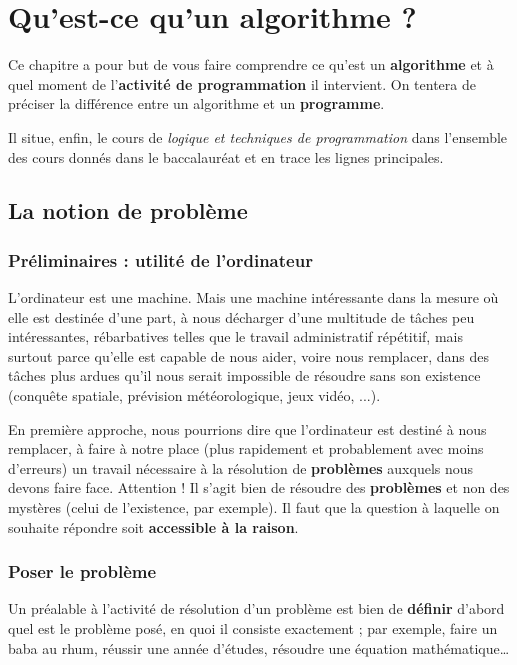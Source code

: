 \chapter{Qu'est-ce qu'un algorithme ?}

Ce chapitre a pour but de vous faire comprendre ce
qu'est un \textbf{algorithme} et à quel moment de
l'\textbf{activité de programmation} il intervient. 
On tentera de préciser la différence entre un algorithme 
et un \textbf{programme}.

Il situe, enfin, le cours de \textit{logique et techniques de
programmation} dans l’ensemble des cours donnés dans le baccalauréat et
en trace les lignes principales.

\section{La notion de problème}

	\subsection{Préliminaires : utilité de l’ordinateur}
	
		L’ordinateur est une machine. Mais une machine intéressante dans la
		mesure où elle est destinée d’une part, à nous décharger d’une
		multitude de tâches peu intéressantes, rébarbatives telles que le
		travail administratif répétitif, mais surtout parce qu’elle est capable
		de nous aider, voire nous remplacer, dans des tâches plus ardues qu’il
		nous serait impossible de résoudre sans son existence (conquête
		spatiale, prévision météorologique, jeux vidéo, ...).
		
		En première approche, nous pourrions dire que l’ordinateur est destiné à
		nous remplacer, à faire à notre place (plus rapidement et probablement
		avec moins d’erreurs) un travail nécessaire à la résolution de
		\textbf{problèmes} auxquels nous devons faire face. Attention ! Il
		s’agit bien de résoudre des \textbf{problèmes} et non des mystères
		(celui de l’existence, par exemple). Il faut que la question à laquelle
		on souhaite répondre soit \textbf{accessible à la raison}.

	\subsection{Poser le problème}
	
		Un préalable à l’activité de résolution d’un problème est bien de
		\textbf{définir} d’abord quel est le problème posé, en quoi il consiste
		exactement ; par exemple, faire un baba au rhum, réussir une année
		d’études, résoudre une équation mathématique…
		
